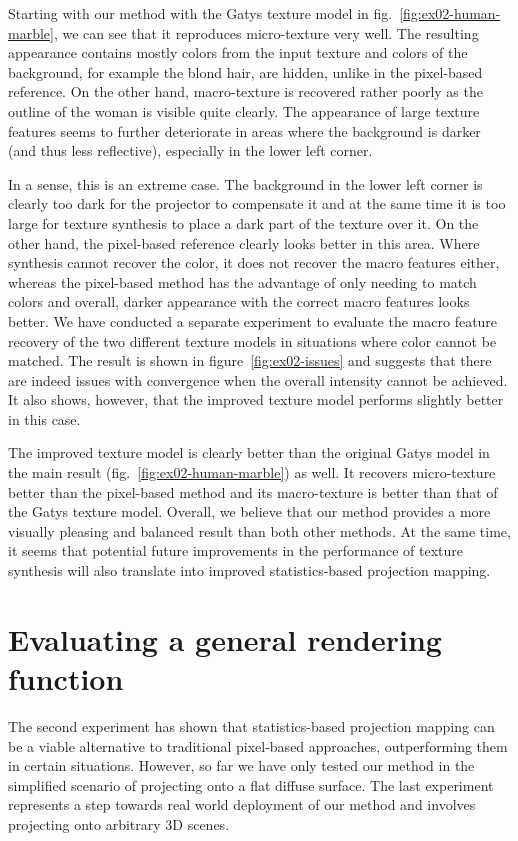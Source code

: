 Starting with our method with the Gatys texture model in fig.~\ref{fig:ex02-human-marble}, we can see that it reproduces micro-texture very well. The resulting appearance contains mostly colors from the input texture and colors of the background, for example the blond hair, are hidden, unlike in the pixel-based reference. On the other hand, macro-texture is recovered rather poorly as the outline of the woman is visible quite clearly. The appearance of large texture features seems to further deteriorate in areas where the background is darker (and thus less reflective), especially in the lower left corner.

In a sense, this is an extreme case. The background in the lower left corner is clearly too dark for the projector to compensate it and at the same time it is too large for texture synthesis to place a dark part of the texture over it. On the other hand, the pixel-based reference clearly looks better in this area. Where synthesis cannot recover the color, it does not recover the macro features either, whereas the pixel-based method has the advantage of only needing to match colors and overall, darker appearance with the correct macro features looks better. We have conducted a separate experiment to evaluate the macro feature recovery of the two different texture models in situations where color cannot be matched. The result is shown in figure~\ref{fig:ex02-issues} and suggests that there are indeed issues with convergence when the overall intensity cannot be achieved. It also shows, however, that the improved texture model performs slightly better in this case.

The improved texture model is clearly better than the original Gatys model in the main result (fig.~\ref{fig:ex02-human-marble}) as well. It recovers micro-texture better than the pixel-based method and its macro-texture is better than that of the Gatys texture model. Overall, we believe that our method provides a more visually pleasing and balanced result than both other methods. At the same time, it seems that potential future improvements in the performance of texture synthesis will also translate into improved statistics-based projection mapping.

\section{Evaluating a general rendering function}
\label{section:results-experiments-03}

The second experiment has shown that statistics-based projection mapping can be a viable alternative to traditional pixel-based approaches, outperforming them in certain situations. However, so far we have only tested our method in the simplified scenario of projecting onto a flat diffuse surface. The last experiment represents a step towards real world deployment of our method and involves projecting onto arbitrary 3D scenes.

